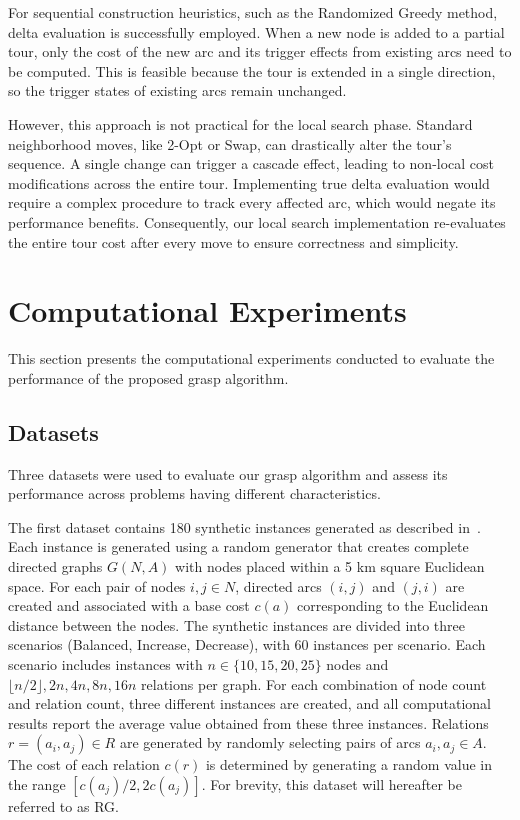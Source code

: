 \documentclass[twocolumn, switch]{article} %
\begin{document}
For sequential construction heuristics, such as the Randomized Greedy method, delta evaluation is successfully employed. When a new node is added to a partial tour, only the cost of the new arc and its trigger effects from existing arcs need to be computed. This is feasible because the tour is extended in a single direction, so the trigger states of existing arcs remain unchanged.

However, this approach is not practical for the local search phase. Standard neighborhood moves, like 2-Opt or Swap, can drastically alter the tour's sequence. A single change can trigger a cascade effect, leading to non-local cost modifications across the entire tour. Implementing true delta evaluation would require a complex procedure to track every affected arc, which would negate its performance benefits. Consequently, our local search implementation re-evaluates the entire tour cost after every move to ensure correctness and simplicity.

\section{Computational Experiments}
This section presents the computational experiments conducted to evaluate the performance of the proposed \gls{grasp} algorithm.

\subsection{Datasets}

Three datasets were used to evaluate our \gls{grasp} algorithm and assess its performance across problems having different characteristics.

The first dataset contains 180 synthetic instances generated as described in~\citet{Cerrone}.
Each instance is generated using a random generator that creates complete directed graphs $G(N,A)$ 
with nodes placed within a 5 km square Euclidean space. 
For each pair of nodes $i, j \in N$, directed arcs $(i, j)$ and $(j, i)$ are created and associated with a base cost $c(a)$ 
corresponding to the Euclidean distance between the nodes. The synthetic instances are divided into three scenarios 
(Balanced, Increase, Decrease), with 60 instances per scenario. Each scenario includes instances with $n \in \{10, 15, 20, 25\}$ 
nodes and $\lfloor n/2 \rfloor, 2n, 4n, 8n, 16n$ relations per graph. For each combination of node count and relation count, three 
different instances are created, and all computational results report the average value obtained from these three instances.
Relations $r = (a_i, a_j) \in R$ are generated by randomly selecting pairs of arcs $a_i, a_j \in A$. The cost of each relation $c(r)$ 
is determined by generating a random value in the range $[c(a_j)/2, 2c(a_j)]$. For brevity, this dataset will hereafter be referred to as RG.
\end{document}
